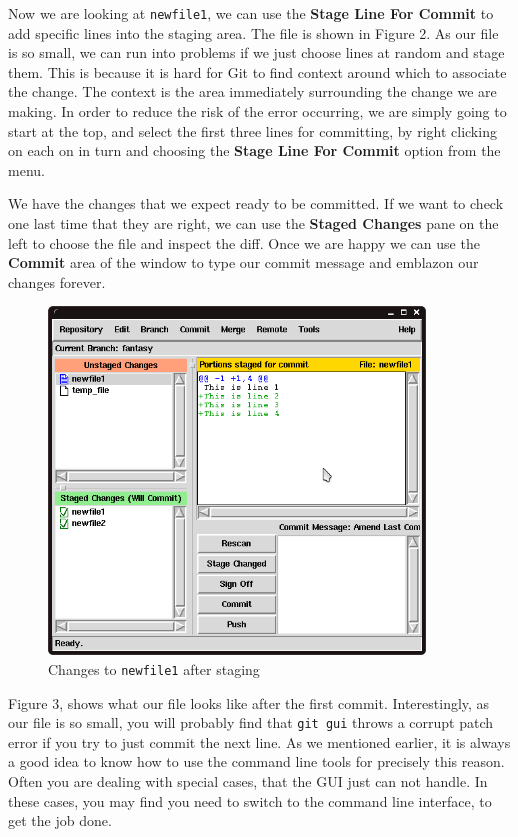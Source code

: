 Now we are looking at \texttt{newfile1}, we can use the \textbf{Stage Line For Commit} to add specific lines into the staging area.
The file is shown in Figure 2.
As our file is so small, we can run into problems if we just choose lines at random and stage them.
This is because it is hard for Git to find context around which to associate the change.
The context is the area immediately surrounding the change we are making.
In order to reduce the risk of the error occurring, we are simply going to start at the top, and select the first three lines for committing, by right clicking on each on in turn and choosing the \textbf{Stage Line For Commit} option from the menu.

We have the changes that we expect ready to be committed.
If we want to check one last time that they are right, we can use the \textbf{Staged Changes} pane on the left to choose the file and inspect the diff.
Once we are happy we can use the \textbf{Commit} area of the window to type our commit message and emblazon our changes forever.

\begin{figure}[hbt]
\centering
\includegraphics[width=10cm]{images/f-af5-d3.png}
\caption{Changes to \texttt{newfile1} after staging}
\end{figure}

Figure 3, shows what our file looks like after the first commit.
Interestingly, as our file is so small, you will probably find that \texttt{git gui} throws a corrupt patch error if you try to just commit the next line.
As we mentioned earlier, it is always a good idea to know how to use the command line tools for precisely this reason.
Often you are dealing with special cases, that the GUI just can not handle.
In these cases, you may find you need to switch to the command line interface, to get the job done.

